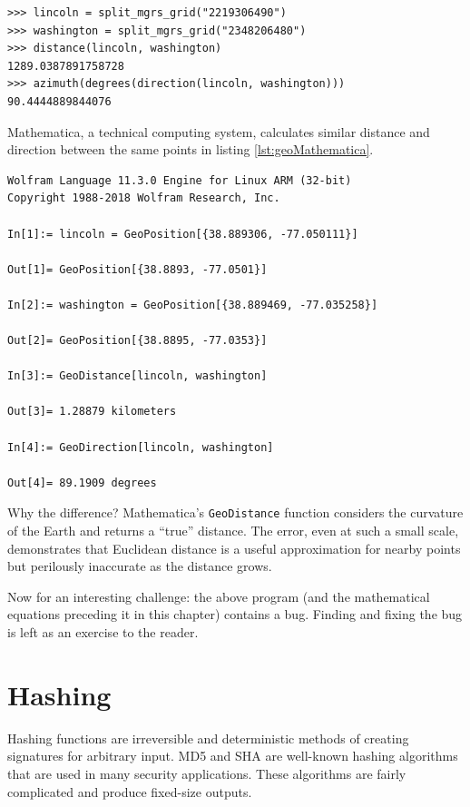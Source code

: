 \documentclass{book}
\begin{document}
\begin{lstlisting}
>>> lincoln = split_mgrs_grid("2219306490")
>>> washington = split_mgrs_grid("2348206480")
>>> distance(lincoln, washington)
1289.0387891758728
>>> azimuth(degrees(direction(lincoln, washington)))
90.4444889844076
\end{lstlisting}

Mathematica, a technical computing system, calculates similar distance and direction between the same points in listing \ref{lst:geoMathematica}.

\begin{lstlisting}[float,caption={Distance computed in Mathematica},captionpos=b,label={lst:geoMathematica}]
Wolfram Language 11.3.0 Engine for Linux ARM (32-bit)
Copyright 1988-2018 Wolfram Research, Inc.

In[1]:= lincoln = GeoPosition[{38.889306, -77.050111}]

Out[1]= GeoPosition[{38.8893, -77.0501}]

In[2]:= washington = GeoPosition[{38.889469, -77.035258}]

Out[2]= GeoPosition[{38.8895, -77.0353}]

In[3]:= GeoDistance[lincoln, washington]

Out[3]= 1.28879 kilometers

In[4]:= GeoDirection[lincoln, washington]

Out[4]= 89.1909 degrees
\end{lstlisting}

Why the difference? Mathematica's \texttt{GeoDistance} function considers the curvature of the Earth and returns a ``true'' distance. The error, even at such a small scale, demonstrates that Euclidean distance is a useful approximation for nearby points but perilously inaccurate as the distance grows.

Now for an interesting challenge: the above program (and the mathematical equations preceding it in this chapter) contains a bug. Finding and fixing the bug is left as an exercise to the reader.

\chapter{Hashing}

Hashing functions are irreversible and deterministic methods of creating signatures for arbitrary input. MD5 and SHA are well-known hashing algorithms that are used in many security applications. These algorithms are fairly complicated and produce fixed-size outputs.
\end{document}
